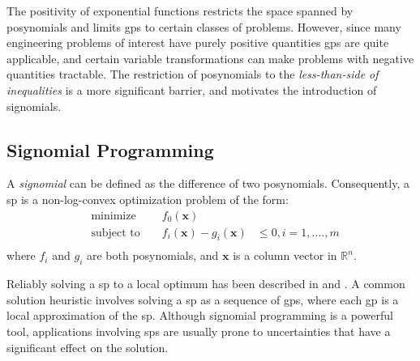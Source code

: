 The positivity of exponential functions restricts the space spanned by posynomials and limits
\gls{gp}s to certain classes of problems.
However, since many engineering problems of interest have purely positive quantities \gls{gp}s
are quite applicable, and certain variable transformations can make problems with negative quantities tractable.
The restriction of posynomials to the \emph{less-than-side of
inequalities} is a more significant barrier, and motivates the introduction of signomials.

\subsection{Signomial Programming}
A {\em signomial} can be defined as the difference of two posynomials. Consequently,
a \gls{sp} is a non-log-convex optimization problem of the form:
\begin{equation}
\begin{aligned}
&\text{minimize } && f_{0}(\mathbf{x}) \\
&\text{subject to } && f_{i}(\mathbf{x}) - g_{i}(\mathbf{x})& \leq 0, i = 1, ...., m \\
\end{aligned}
\end{equation}
where $f_{i}$ and $g_{i}$ are both posynomials, and $\mathbf{x}$ is a column vector in $\mathbb{R}^n$. 

Reliably solving a \gls{sp} to a local optimum has been described in \cite{Boyd2007} and \cite{Lipp2016}.
A common solution heuristic involves solving a \gls{sp} as a sequence of \gls{gp}s,
where each \gls{gp} is a local approximation of the \gls{sp}.
Although signomial programming is a powerful tool, applications involving \gls{sp}s are usually prone
to uncertainties that have a significant effect on the solution.
